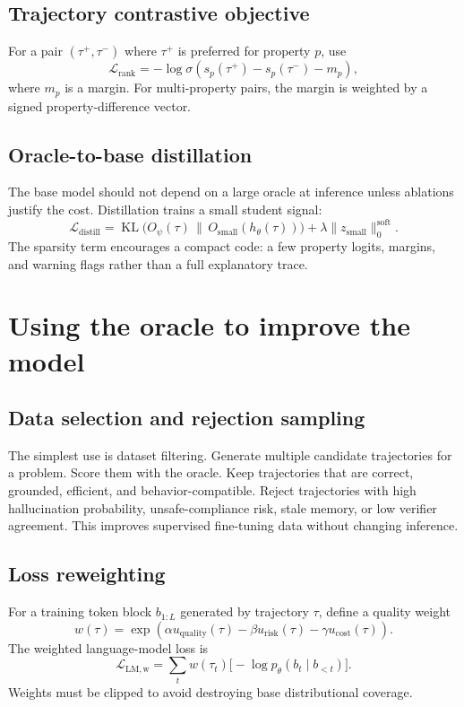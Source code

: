 \documentclass[11pt]{article}
\newcommand{\KL}{\operatorname{KL}}
\newcommand{\loss}{\mathcal{L}}
\numberwithin{equation}{section}
\begin{document}
\subsection{Trajectory contrastive objective}
For a pair $(\tau^+,
\tau^-)$ where $\tau^+$ is preferred for property $p$, use
\begin{equation}
\loss_{\mathrm{rank}}= -\log \sigma\left(s_p(\tau^+)-s_p(\tau^-)-m_p\right),
\end{equation}
where $m_p$ is a margin. For multi-property pairs, the margin is weighted by a signed property-difference vector.

\subsection{Oracle-to-base distillation}
The base model should not depend on a large oracle at inference unless ablations justify the cost. Distillation trains a small student signal:
\begin{equation}
\loss_{\mathrm{distill}}=\KL\bigl(O_\psi(\tau)\,\|\,O_{\mathrm{small}}(h_\theta(\tau))\bigr)+\lambda\|z_{\mathrm{small}}\|_0^{\mathrm{soft}}.
\end{equation}
The sparsity term encourages a compact code: a few property logits, margins, and warning flags rather than a full explanatory trace.

\section{Using the oracle to improve the model}
\subsection{Data selection and rejection sampling}
The simplest use is dataset filtering. Generate multiple candidate trajectories for a problem. Score them with the oracle. Keep trajectories that are correct, grounded, efficient, and behavior-compatible. Reject trajectories with high hallucination probability, unsafe-compliance risk, stale memory, or low verifier agreement. This improves supervised fine-tuning data without changing inference.

\subsection{Loss reweighting}
For a training token block $b_{1:L}$ generated by trajectory $\tau$, define a quality weight
\begin{equation}
w(\tau)=\exp\left(\alpha u_{\mathrm{quality}}(\tau)-\beta u_{\mathrm{risk}}(\tau)-\gamma u_{\mathrm{cost}}(\tau)\right).
\end{equation}
The weighted language-model loss is
\begin{equation}
\loss_{\mathrm{LM,w}}=\sum_t w(\tau_t)\bigl[-\log p_\theta(b_t\mid b_{<t})\bigr].
\end{equation}
Weights must be clipped to avoid destroying base distributional coverage.
\end{document}
